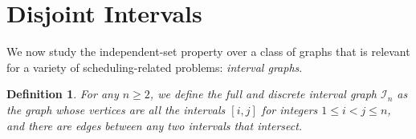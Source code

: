 \documentclass[11pt]{article}
\newtheorem{definition}[theorem]{Definition}
\begin{document}
\section{Disjoint Intervals}\label{sec:disjoint-intervals}

We now study the independent-set property over a class of graphs that is relevant for a variety of scheduling-related problems: \emph{interval graphs}. 
\begin{definition}
    For any $n \geq 2$, we define the full and discrete interval graph $\mathcal{I}_n$ as the graph whose vertices are all the intervals $[i, j]$ for integers $1 \leq i < j \leq n$, 
    and there are edges between any two intervals that intersect.
\end{definition}

\begin{figure}
    \begin{subfigure}{0.48\textwidth}
        
\end{subfigure}
\end{figure}
\end{document}

